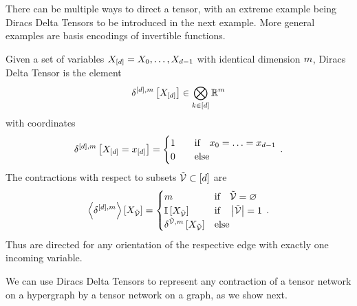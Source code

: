 There can be multiple ways to direct a tensor, with an extreme example being Diracs Delta Tensors to be introduced in the next example.
More general examples are basis encodings of invertible functions.

\begin{example}\label{exa:diracDeltaTensor}
    Given a set of variables $X_{[d]}=X_{0},\ldots,X_{d-1}$ with identical dimension $m$, Diracs Delta Tensor is the element
    \begin{align*}
        \delta^{[d],m}\left[X_{[d]}\right] \in \bigotimes_{k\in[d]} \mathbb{R}^{m}
    \end{align*}
    with coordinates
    \begin{align}
        \delta^{[d],m}\left[X_{[d]}=x_{[d]}\right] =
        \begin{cases}
            1 \quad & \text{if} \quad x_{0} = \ldots = x_{d-1} \\
            0 & \text{else}
        \end{cases} \, .
    \end{align}
    The contractions with respect to subsets $\tilde{\mathcal{V}}\subset[d]$ are
    \begin{align}
        \left\langle \delta^{[d],m}\right\rangle \left[ X_{\tilde{\mathcal{V}}} \right] =
        \begin{cases}
            m & \text{if} \quad \tilde{\mathcal{V}} = \varnothing \\
            \mathbb{I}\left[X_{\tilde{\mathcal{V}}}\right] & \text{if} \quad \left|\tilde{\mathcal{V}}\right| = 1\\
            \delta^{\tilde{\mathcal{V}},m}\left[X_{\tilde{\mathcal{V}}}\right] & \text{else}
        \end{cases} \, .
    \end{align}
    Thus are directed for any orientation of the respective edge with exactly one incoming variable.
\end{example}

We can use Diracs Delta Tensors to represent any contraction of a tensor network on a hypergraph by a tensor network on a graph, as we show next.


